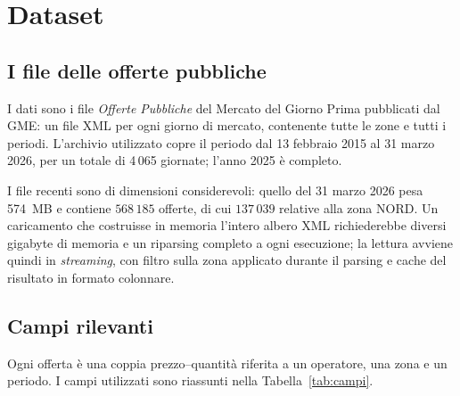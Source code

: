 
\section{Dataset}
\label{sec:dataset}

\subsection{I file delle offerte pubbliche}

I dati sono i file \emph{Offerte Pubbliche} del Mercato del Giorno Prima pubblicati dal GME:
un file XML per ogni giorno di mercato, contenente tutte le zone e tutti i periodi. L'archivio
utilizzato copre il periodo dal 13 febbraio 2015 al 31 marzo 2026, per un totale di 4\,065
giornate; l'anno 2025 \`e completo.

I file recenti sono di dimensioni considerevoli: quello del 31 marzo 2026 pesa 574~MB e
contiene $568\,185$ offerte, di cui $137\,039$ relative alla zona NORD. Un caricamento che
costruisse in memoria l'intero albero XML richiederebbe diversi gigabyte di memoria e un
riparsing completo a ogni esecuzione; la lettura avviene quindi in \emph{streaming}, con
filtro sulla zona applicato durante il parsing e cache del risultato in formato colonnare.

\subsection{Campi rilevanti}

Ogni offerta \`e una coppia prezzo--quantit\`a riferita a un operatore, una zona e un periodo.
I campi utilizzati sono riassunti nella Tabella~\ref{tab:campi}.

